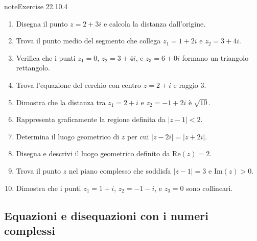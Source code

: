 \documentclass[letterpaper,10pt,italian]{jupyterBook}
\begin{document}
\begin{sphinxadmonition}{note}{Exercise 22.10.4}


\begin{enumerate}
%
\item {} 
\sphinxAtStartPar
Disegna il punto \(z = 2 + 3i\) e calcola la distanza dall’origine.

\item {} 
\sphinxAtStartPar
Trova il punto medio del segmento che collega \(z_1 = 1 + 2i\) e \(z_2 = 3 + 4i\).

\item {} 
\sphinxAtStartPar
Verifica che i punti \(z_1 = 0\), \(z_2 = 3 + 4i\), e \(z_3 = 6 + 0i\) formano un triangolo rettangolo.

\item {} 
\sphinxAtStartPar
Trova l’equazione del cerchio con centro \(z = 2 + i\) e raggio \(3\).

\item {} 
\sphinxAtStartPar
Dimostra che la distanza tra \(z_1 = 2 + i\) e \(z_2 = -1 + 2i\) è \(\sqrt{10}\).

\item {} 
\sphinxAtStartPar
Rappresenta graficamente la regione definita da \(|z - 1| < 2\).

\item {} 
\sphinxAtStartPar
Determina il luogo geometrico di \(z\) per cui \(|z - 2i| = |z + 2i|\).

\item {} 
\sphinxAtStartPar
Disegna e descrivi il luogo geometrico definito da \(\text{Re}(z) = 2\).

\item {} 
\sphinxAtStartPar
Trova il punto \(z\) nel piano complesso che soddisfa \(|z - 1| = 3\) e \(\text{Im}(z) > 0\).

\item {} 
\sphinxAtStartPar
Dimostra che i punti \(z_1 = 1 + i\), \(z_2 = -1 - i\), e \(z_3 = 0\) sono collineari.

\end{enumerate}
\end{sphinxadmonition}


\subsection{Equazioni e disequazioni con i numeri complessi}
\label{\detokenize{ch/algebra/complex-algebra-problems:equazioni-e-disequazioni-con-i-numeri-complessi}}\label{\detokenize{ch/algebra/complex-algebra-problems:math-hs-algebra-complex-problems-equations}}
\end{document}
